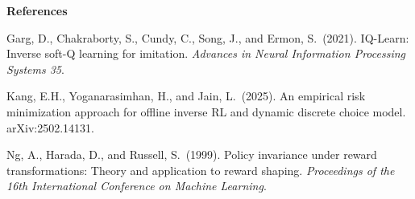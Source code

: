 \documentclass[11pt]{article}
\begin{document}
\bigskip
\noindent\textbf{References}

\smallskip\noindent
Garg, D., Chakraborty, S., Cundy, C., Song, J., and Ermon, S.\ (2021). IQ-Learn: Inverse soft-Q learning for imitation. \textit{Advances in Neural Information Processing Systems 35}.

\smallskip\noindent
Kang, E.H., Yoganarasimhan, H., and Jain, L.\ (2025). An empirical risk minimization approach for offline inverse RL and dynamic discrete choice model. arXiv:2502.14131.

\smallskip\noindent
Ng, A., Harada, D., and Russell, S.\ (1999). Policy invariance under reward transformations: Theory and application to reward shaping. \textit{Proceedings of the 16th International Conference on Machine Learning}.
\end{document}

